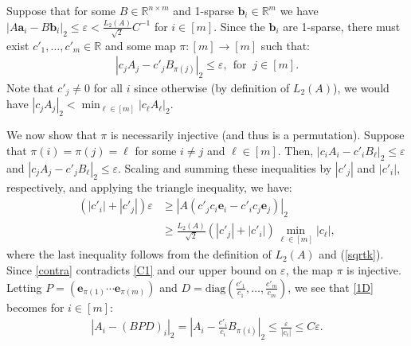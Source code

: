 \documentclass[journal, twocolumn]{IEEEtran}
\begin{document}
Suppose that for some $B \in \mathbb{R}^{n \times m}$ and 1-sparse $\mathbf{b}_i \in \mathbb{R}^m$ we have  $|A\mathbf{a}_i - B\mathbf{b}_i|_2 \leq \varepsilon < \frac{L_2(A)}{\sqrt{2}}C^{-1}$ for $i \in [m]$. Since the $\mathbf{b}_i$ are 1-sparse, there must exist $c'_1, \ldots, c'_m \in \mathbb{R}$ and some map $\pi: [m] \to [m]$ such that:
\begin{align}\label{1D}
|c_jA_j - c'_jB_{\pi(j)}|_2 \leq \varepsilon, \ \ \text{for } \  j \in [m].
\end{align} 
Note that $c'_j \neq 0$ for all $i$ since otherwise (by definition of $L_2(A)$), we would have $|c_jA_j|_2 < \min_{\ell \in [m]}|c_{\ell}A_{\ell}|_2$. 

We  now show that $\pi$ is necessarily injective (and thus is a permutation). %
Suppose that $\pi(i) = \pi(j) = \ell$ for some $i \neq j$ and $\ell \in [m]$. Then, $|c_iA_i - c'_iB_{\ell}|_2  \leq \varepsilon$ and $|c_jA_j - c'_jB_{\ell}|_2 \leq \varepsilon$. Scaling and summing these inequalities by $|c'_j|$ and $|c'_i|$, respectively, and applying the triangle inequality, we have:
\begin{align}\label{contra}
(|c'_i| + |c'_j|) \varepsilon
&\geq |A(c'_jc_i\mathbf{e}_i - c'_ic_j\mathbf{e}_j)|_2 \nonumber \\ 
&\geq \frac{L_2(A)}{\sqrt{2}} \left( |c'_j| + |c'_i| \right) \min_{\ell \in [m]} |c_\ell |,
\end{align}
%
where the last inequality follows from the definition of $L_2(A)$ and (\ref{sqrtk}). Since \eqref{contra} contradicts \eqref{C1} and our upper bound on $\varepsilon$, the map $\pi$ is injective. Letting $P = \left( \mathbf{e}_{\pi(1)} \cdots \mathbf{e}_{\pi(m)}\right)$ and $D = \text{diag}(\frac{c'_1}{c_1},\ldots,\frac{c'_m}{c_m})$, we see that \eqref{1D} becomes for $i \in [m]$:
\begin{align}\label{k=1result}
|A_i - (BPD)_i|_2 = |A_i - \frac{c'_i}{c_i}B_{\pi(i)}|_2 \leq \frac{\varepsilon}{|c_i|} \leq C\varepsilon.
\end{align}
\end{document}
